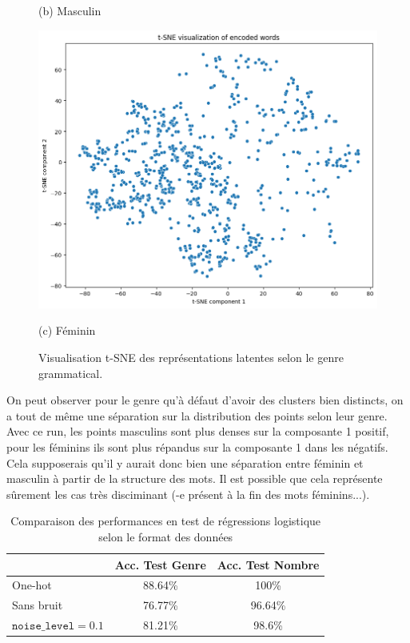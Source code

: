 \documentclass{article}
\begin{document}
\begin{figure}[H]
\begin{minipage}[b]{0.32\textwidth}
        \caption*{(b) Masculin}
        \label{fig:m}
    \end{minipage}
    \hfill
    \begin{minipage}[b]{0.32\textwidth}
        \centering
        \includegraphics[width=\textwidth]{Images/tsne_f.png}
        \caption*{(c) Féminin}
        \label{fig:f}
    \end{minipage}
    \caption{Visualisation t-SNE des représentations latentes selon le genre grammatical.}
    \label{fig:tsne_genre}
\end{figure}

On peut observer pour le genre qu'à défaut d'avoir des clusters bien distincts, on a tout de même une séparation sur la distribution des points selon leur genre. Avec ce run, les points masculins sont plus denses sur la composante 1 positif, pour les féminins ils sont plus répandus sur la composante 1 dans les négatifs. Cela supposerais qu'il y aurait donc bien une séparation entre féminin et masculin à partir de la structure des mots. Il est possible que cela représente sûrement les cas très disciminant (-e présent à la fin des mots féminins...).

\begin{table}[H]
\centering
\begin{tabular}{lcc}
\hline
 & \textbf{Acc. Test Genre} & \textbf{Acc. Test Nombre} \\
\hline
One-hot & 88.64\% & 100\% \\
Sans bruit & 76.77\% & 96.64\% \\
$\texttt{noise\_level} = 0.1$ & 81.21\% & 98.6\% \\
\hline
\end{tabular}
\caption{Comparaison des performances en test de régressions logistique selon le format des données}
\end{table}
\end{document}
